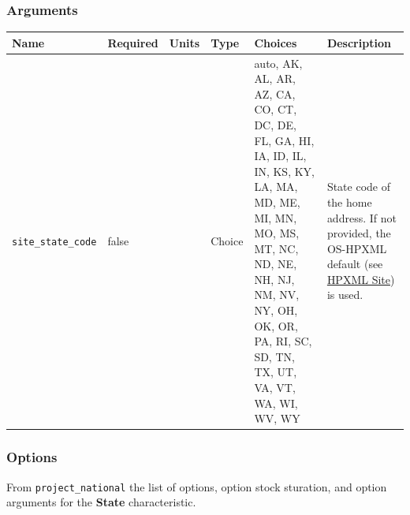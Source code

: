 \subsubsection{Arguments}\label{arguments-100}

\begin{longtable}[]{@{}llllll@{}}
\toprule\noalign{}
Name & Required & Units & Type & Choices & Description \\
\midrule\noalign{}
\endhead
\bottomrule\noalign{}
\endlastfoot
\texttt{site\_state\_code} & false & & Choice & auto, AK, AL, AR, AZ,
CA, CO, CT, DC, DE, FL, GA, HI, IA, ID, IL, IN, KS, KY, LA, MA, MD, ME,
MI, MN, MO, MS, MT, NC, ND, NE, NH, NJ, NM, NV, NY, OH, OK, OR, PA, RI,
SC, SD, TN, TX, UT, VA, VT, WA, WI, WV, WY & State code of the home
address. If not provided, the OS-HPXML default (see
\href{https://openstudio-hpxml.readthedocs.io/en/v1.7.0/workflow_inputs.html\#hpxml-site}{HPXML
Site}) is used. \\
\end{longtable}

\subsubsection{Options}\label{options-142}

From \texttt{project\_national} the list of options, option stock
sturation, and option arguments for the \textbf{State} characteristic.

